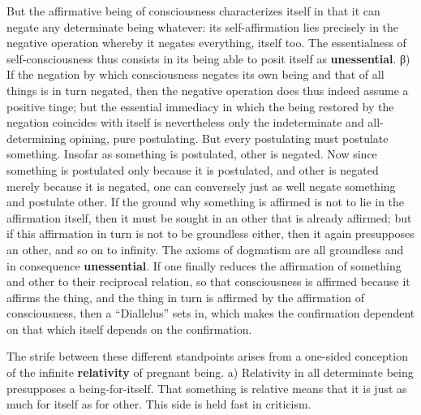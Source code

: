 \documentclass[12pt,a4paper,openany]{book}
\newcommand{\opage}[1]{\marginnote{\footnotesize\textit{[#1]}}}
\begin{document}
But the affirmative being of consciousness characterizes itself in that it can negate any determinate being whatever: its self-affirmation lies precisely in the negative operation whereby it negates everything, itself too. The essentialness of self-consciousness thus consists in its being able to posit itself as \textbf{unessential}.
β) If the negation by which consciousness negates its own being and that of all things is in turn negated, then the negative operation does thus indeed assume a
\setcounter{footnote}{0}%
\opage{89}positive tinge; but the essential immediacy in which the being restored by the negation coincides with itself is nevertheless only the indeterminate and all-determining opining, pure postulating. But every postulating must postulate something. Insofar as something is postulated, other is negated. Now since something is postulated only because it is postulated, and other is negated merely because it is negated, one can conversely just as well negate something and postulate other. If the ground why something is affirmed is not to lie in the affirmation itself, then it must be sought in an other that is already affirmed; but if this affirmation in turn is not to be groundless either, then it again presupposes an other, and so on to infinity. The axioms of dogmatism are all groundless and in consequence \textbf{unessential}.
If one finally reduces the affirmation of something and other to their reciprocal relation, so that consciousness is affirmed because it affirms the thing, and the thing in turn is affirmed by the affirmation of consciousness, then a ``Diallelus'' sets in, which makes the confirmation dependent on that which itself depends on
the confirmation.

The strife between these different standpoints arises from a one-sided conception of the infinite \textbf{relativity} of pregnant being.
a) Relativity in all determinate being presupposes a being-for-itself. That something is relative means that it is just as much for itself as for other. This side is held fast in criticism.
\end{document}
